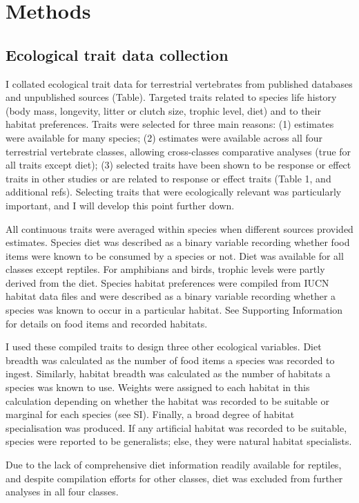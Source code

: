 \section{Methods}

\subsection{Ecological trait data collection}
I collated ecological trait data for terrestrial vertebrates from published databases and unpublished sources (Table). Targeted traits related to species life history (body mass, longevity, litter or clutch size, trophic level, diet) and to their habitat preferences. Traits were selected for three main reasons: (1) estimates were available for many species; (2) estimates were available across all four terrestrial vertebrate classes, allowing cross-classes comparative analyses (true for all traits except diet); (3) selected traits have been shown to be response or effect traits in other studies or are related to response or effect traits (Table 1, and additional refs). Selecting traits that were ecologically relevant was particularly important, and I will develop this point further down.

All continuous traits were averaged within species when different sources provided estimates. Species diet was described as a binary variable recording whether food items were known to be consumed by a species or not. Diet was available for all classes except reptiles. For amphibians and birds, trophic levels were partly derived from the diet. Species habitat preferences were compiled from IUCN habitat data files and were described as a binary variable recording whether a species was known to occur in a particular habitat. See Supporting Information for details on food items and recorded habitats.

I used these compiled traits to design three other ecological variables. Diet breadth was calculated as the number of food items a species was recorded to ingest. Similarly, habitat breadth was calculated as the number of habitats a species was known to use. Weights were assigned to each habitat in this calculation depending on whether the habitat was recorded to be suitable or marginal for each species (see SI). Finally, a broad degree of habitat specialisation was produced. If any artificial habitat was recorded to be suitable, species were reported to be generalists; else, they were natural habitat specialists.

Due to the lack of comprehensive diet information readily available for reptiles, and despite compilation efforts for other classes, diet was excluded from further analyses in all four classes.

